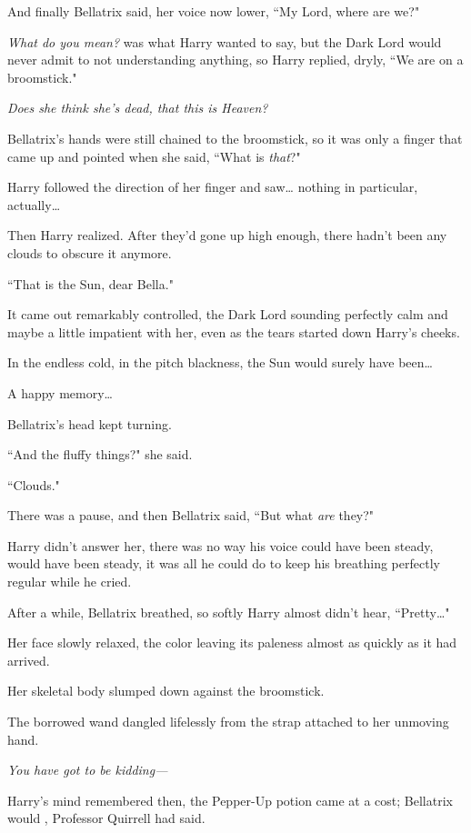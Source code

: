 And finally Bellatrix said, her voice now lower, ``My Lord, where are we?"

\emph{What do you mean?} was what Harry wanted to say, but the Dark Lord would never admit to not understanding anything, so Harry replied, dryly, ``We are on a broomstick."

\emph{Does she think she's dead, that this is Heaven?}

Bellatrix's hands were still chained to the broomstick, so it was only a finger that came up and pointed when she said, ``What is \emph{that}?"

Harry followed the direction of her finger and saw{\ldots} nothing in particular, actually{\ldots}

Then Harry realized. After they'd gone up high enough, there hadn't been any clouds to obscure it anymore.

``That is the Sun, dear Bella."

It came out remarkably controlled, the Dark Lord sounding perfectly calm and maybe a little impatient with her, even as the tears started down Harry's cheeks.

In the endless cold, in the pitch blackness, the Sun would surely have been{\ldots}

A happy memory{\ldots}

Bellatrix's head kept turning.

``And the fluffy things?" she said.

``Clouds."

There was a pause, and then Bellatrix said, ``But what \emph{are} they?"

Harry didn't answer her, there was no way his voice could have been steady, would have been steady, it was all he could do to keep his breathing perfectly regular while he cried.

After a while, Bellatrix breathed, so softly Harry almost didn't hear, ``Pretty{\ldots}"

Her face slowly relaxed, the color leaving its paleness almost as quickly as it had arrived.

Her skeletal body slumped down against the broomstick.

The borrowed wand dangled lifelessly from the strap attached to her unmoving hand.

\emph{You have \emph{got} to be \emph{kidding}---}

Harry's mind remembered then, the Pepper-Up potion came at a cost; Bellatrix would , Professor Quirrell had said.

